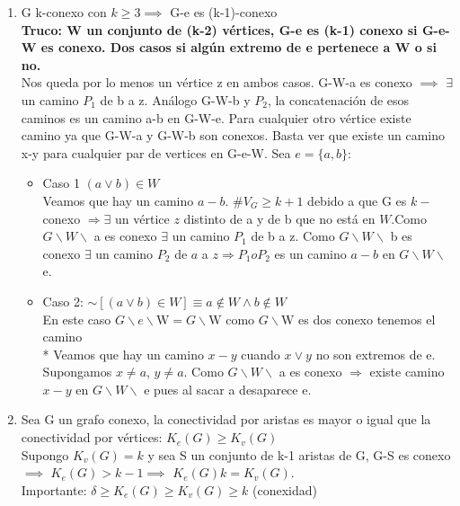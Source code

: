 \documentclass{article}
\begin{document}
\begin{enumerate}
    \item G k-conexo con $k\geq3\implies$ G-e es (k-1)-conexo \\
    \textbf{Truco: W un conjunto de (k-2) vértices, G-e es (k-1) conexo si G-e-W es conexo. Dos casos si algún extremo de e pertenece a W o si no.} \\
    Nos queda por lo menos un vértice z en ambos casos. G-W-a es conexo $\implies$ $\exists$ un camino $P_1$ de b a z. Análogo G-W-b y $P_2$, la concatenación de esos caminos es un camino a-b en G-W-e.
    Para cualquier otro vértice existe camino ya que G-W-a y G-W-b son conexos.
    Basta ver que existe un camino x-y para cualquier par de vertices en G-e-W. Sea $e=\{a,b\}:$
    \begin{itemize}
        \item Caso 1 $(a \vee b) \in W$ \\
        Veamos que hay un camino $a-b$. $\# V_{G} \geq k+1$ debido a que G es $k-$ conexo $\Rightarrow \exists$ un vértice $z$ distinto de a y de b que no está en $W$.Como $G \backslash W \backslash$ a es conexo $\exists$ un camino $P_{1}$ de b a z. Como $G \backslash W \backslash$ b es conexo $\exists$ un camino $P_{2}$ de $a$ a $z \Rightarrow P_{1} o P_{2}$ es un camino $a-b$ en $G \backslash W \backslash$ e.
        \item Caso 2: $\sim[(a \vee b) \in W] \equiv a \notin W \wedge b \notin W$ \\ En este caso $G \backslash e \backslash \mathrm{W}=G \backslash \mathrm{W}$ como $G \backslash \mathrm{W}$ es dos conexo tenemos el camino \\* 
        Veamos que hay un camino $x-y$ cuando $x \lor y$ no son extremos de e. Supongamos $x \neq a$, $y \neq a .$ Como $G \backslash W \backslash$ a es conexo $\Rightarrow$ existe camino $x-y$ en $G \backslash W \backslash$ e pues al sacar a desaparece e.
    \end{itemize}

    \item Sea G un grafo conexo, la conectividad por aristas es mayor o igual que la conectividad por vértices: $K_e(G)\geq K_v(G)$ \\
    Supongo $K_v(G) = k$ y sea S un conjunto de k-1 aristas de G, G-S es conexo $\implies$ $K_e(G)>k-1 \implies$ $K_e(G)k = K_v(G)$. \\
    Importante: $\delta \geq K_e(G) \geq K_v(G) \geq k$ (conexidad)
    

\end{enumerate}
\end{document}
